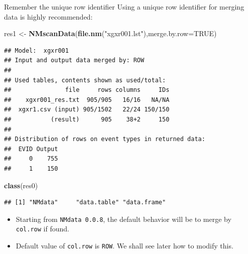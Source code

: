 \documentclass[
  8pt,
  ignorenonframetext,
  aspectratio=169]{beamer}
\newenvironment{Shaded}{\begin{snugshade}}{\end{snugshade}}
\newcommand{\DataTypeTok}[1]{\textcolor[rgb]{0.13,0.29,0.53}{#1}}
\newcommand{\KeywordTok}[1]{\textcolor[rgb]{0.13,0.29,0.53}{\textbf{#1}}}
\newcommand{\NormalTok}[1]{#1}
\newcommand{\OtherTok}[1]{\textcolor[rgb]{0.56,0.35,0.01}{#1}}
\newcommand{\StringTok}[1]{\textcolor[rgb]{0.31,0.60,0.02}{#1}}
\providecommand{\tightlist}{%
  \setlength{\itemsep}{0pt}\setlength{\parskip}{0pt}}
\begin{document}
\begin{frame}[fragile]{Remember the unique row identifier}
\protect\hypertarget{remember-the-unique-row-identifier}{}
Using a unique row identifier for merging data is highly recommended:

\footnotesize

\begin{Shaded}
\begin{Highlighting}[]
\NormalTok{res1 \textless{}{-}}\StringTok{ }\KeywordTok{NMscanData}\NormalTok{(}\KeywordTok{file.nm}\NormalTok{(}\StringTok{"xgxr001.lst"}\NormalTok{),}\DataTypeTok{merge.by.row=}\OtherTok{TRUE}\NormalTok{)}
\end{Highlighting}
\end{Shaded}

\begin{verbatim}
## Model:  xgxr001 
## Input and output data merged by: ROW 
## 
## Used tables, contents shown as used/total:
##               file     rows columns     IDs
##    xgxr001_res.txt  905/905   16/16   NA/NA
##  xgxr1.csv (input) 905/1502   22/24 150/150
##           (result)      905    38+2     150
## 
## Distribution of rows on event types in returned data:
##  EVID Output
##     0    755
##     1    150
\end{verbatim}

\begin{Shaded}
\begin{Highlighting}[]
\KeywordTok{class}\NormalTok{(res0)}
\end{Highlighting}
\end{Shaded}

\begin{verbatim}
## [1] "NMdata"     "data.table" "data.frame"
\end{verbatim}

\normalsize

\begin{itemize}
\tightlist
\item
  Starting from \texttt{NMdata\ 0.0.8}, the default behavior will be to
  merge by \texttt{col.row} if found.
\item
  Default value of \texttt{col.row} is \texttt{ROW}. We shall see later
  how to modify this.
\end{itemize}
\end{frame}
\end{document}

